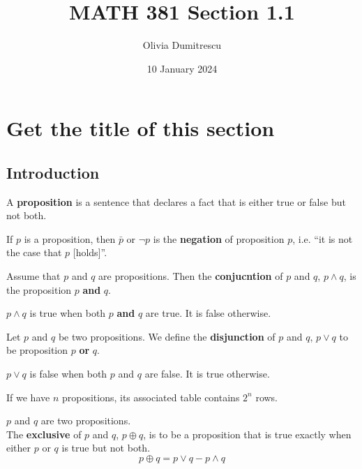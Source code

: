 \documentclass[a4paper, 12pt]{article}
\title{MATH 381 Section 1.1}
\author{Olivia Dumitrescu}
\date{10 January 2024}
\newenvironment{definition}[1][Definition]{\begin{trivlist}
\item[\hskip \labelsep {\bfseries #1}]}{\end{trivlist}}
\newenvironment{remark}[1][Remark]{\begin{trivlist}
\item[\hskip \labelsep {\bfseries #1}]}{\end{trivlist}}
\newcommand{\keyword}[1]{\textbf{#1}}
\begin{document}
    \maketitle
    \section{Get the title of this section}
    \subsection{Introduction}
    \begin{definition}
        A \keyword{proposition} is a sentence that declares a fact that
        is either true or false but not both.
    \end{definition}
    \begin{definition}
        If $p$ is a proposition, then $\bar{p}$ or $\neg p$ is the \keyword{negation}
        of proposition $p$, i.e. ``it is not the case that $p$ [holds]''.
    \end{definition}
    \begin{definition}
        Assume that $p$ and $q$ are propositions. Then the
        \keyword{conjucntion} of $p$ and $q$, $p \wedge q$, is the
        proposition $p$ \keyword{and} $q$.
    \end{definition}
    \begin{remark}
        $p \wedge q$ is true when both $p$ \keyword{and} $q$
        are true. It is false otherwise.
    \end{remark}
    \begin{definition}
        Let $p$ and $q$ be two propositions. We define the
        \keyword{disjunction} of $p$ and $q$, $p \vee q$ to be
        proposition $p$ \keyword{or} $q$.
    \end{definition}
    \begin{remark}
        $p \vee q$ is false when both $p$ and $q$ are false.
        It is true otherwise.
    \end{remark}
    \begin{remark}
        If we have $n$ propositions, its associated table contains $2^n$ rows.
    \end{remark}
    \begin{definition}
        $p$ and $q$ are two propositions.\\
        The \keyword{exclusive} of $p$ and $q$, $p \oplus q$, is to be a proposition
        that is true exactly when either $p$ or $q$ is true but not both.
        \[ p \oplus q = p \vee q - p \wedge q \]
    \end{definition}
\end{document}
